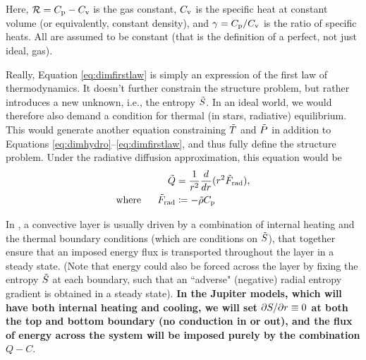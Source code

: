 \documentclass[12pt]{article}
\numberwithin{equation}{section}
\begin{document}
Here, $\mathcal{R}=C_{\rm{p}}-C_{\rm{v}}$ is the gas constant, $C_{\rm{v}}$ is the specific heat at constant volume (or equivalently, constant density), and $\gamma=C_{\rm{p}}/C_{\rm{v}}$ is the ratio of specific heats. All are assumed to be constant (that is the definition of a perfect, not just ideal, gas). 

Really, Equation \eqref{eq:dimfirstlaw} is simply an expression of the first law of thermodynamics. It doesn't further constrain the structure problem, but rather introduces a new unknown, i.e., the entropy $\tilde{S}$. In an ideal world, we would therefore also demand a condition for thermal (in stars, radiative) equilibrium. This would generate another equation constraining $\tilde{T}$ and $\tilde{P}$ in addition to Equations \eqref{eq:dimhydro}--\eqref{eq:dimfirstlaw}, and thus fully define the structure problem. Under the radiative diffusion approximation, this equation would be
\begin{subequations}
\begin{align}
	\tilde{Q} &=  \frac{1}{r^2}\frac{d}{dr} (r^2\tilde{F}_{\rm rad}),\\
	\text{where}\ \ \ \ \  \tilde{F}_{\rm rad} &\coloneqq -\tilde{\rho} C_{\rm{p}}
\end{align}
\end{subequations}



	In {\rayleigh}, a convective layer is usually driven by a combination of internal heating and the thermal boundary conditions (which are conditions on $\tilde{S}$), that together ensure that an imposed energy flux is transported throughout the layer in a steady state. (Note that energy could also be forced across the layer by fixing the entropy $\tilde{S}$ at each boundary, such that an ``adverse" (negative) radial entropy gradient is obtained in a steady state).   \textbf{In the Jupiter models, which will have both internal heating and cooling, we will set $\partial S/\partial r\equiv0$ at both the top and bottom boundary (no conduction in or out), and the flux of energy across the system will be imposed purely by the combination $Q-C$}. 
	
\end{document}
